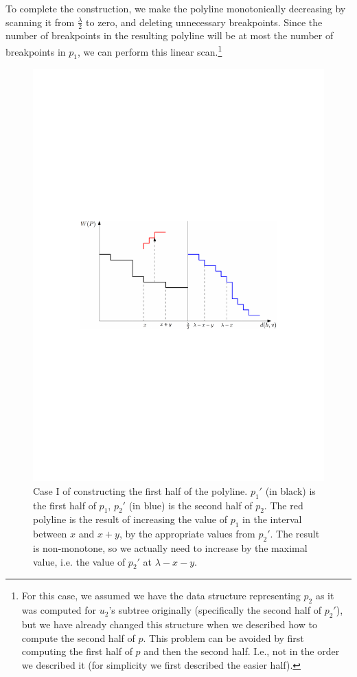 \documentclass[11pt,a4paper]{article}
\theoremstyle{definition}
\theoremstyle{remark}
\begin{document}
To complete the construction, we make the polyline monotonically decreasing by scanning it from $\frac{\lambda}{2}$ to zero, and deleting unnecessary breakpoints. Since the number of breakpoints in the resulting polyline will be at most the number of breakpoints in $p_1$, we can perform this linear scan.\footnote{For this case, we assumed we have the data structure representing $p_2$ as it was computed for $u_2$'s subtree originally (specifically the second half of $p_2'$), but we have already changed this structure when we described how to compute the second half of $p$. This problem can be avoided by first computing the first half of $p$ and  then the  second half. I.e., not in the order we described it (for simplicity we first described the easier half).}

\begin{figure}[h]
\begin{center}
\includegraphics[scale=0.8]{polyline_first_half_construction_case1}
\end{center}
\caption{Case I of constructing the first half of the polyline. $p_1'$ (in black) is the first half of $p_1$, $p_2'$ (in blue) is the second half of $p_2$. The red polyline is the result of increasing the value of $p_1$ in the interval between $x$ and $x+y$, by the appropriate values from $p_2'$. The result is non-monotone, so we actually need to increase by the maximal value, i.e. the value of $p_2'$ at $\lambda-x-y$.\label{figure of constructing the first half of the polyline case 1} 
}
\end{figure}
\end{document}

